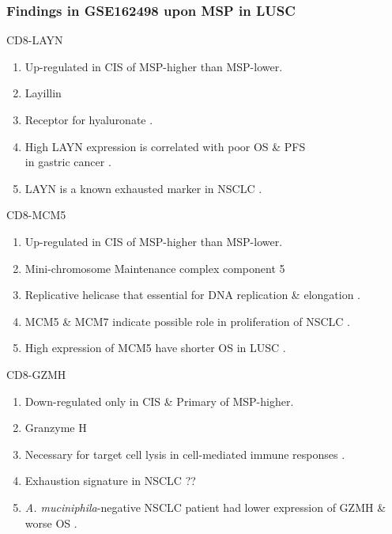 \documentclass{beamer}
\begin{document}
    \begin{frame}[allowframebreaks]
        \frametitle{Findings in GSE162498 upon MSP in LUSC}

        \begin{block}{CD8-LAYN}
            \begin{enumerate}
                \item Up-regulated in CIS of MSP-higher than MSP-lower.
                \item Layillin
                \item Receptor for hyaluronate \cite{LAYN-1}.
                \item High LAYN expression is correlated with poor OS \& PFS \\
                    in gastric cancer \cite{LAYN-2}.
                \item LAYN is a known exhausted marker in NSCLC \cite{LAYN-3}.
            \end{enumerate}
        \end{block}

        \begin{block}{CD8-MCM5}
            \begin{enumerate}
                \item Up-regulated in CIS of MSP-higher than MSP-lower.
                \item Mini-chromosome Maintenance complex component 5
                \item Replicative helicase that essential for DNA replication \& elongation \cite{MCM5-2}.
                \item MCM5 \& MCM7 indicate possible role in proliferation of NSCLC \cite{MCM5-3}.
                \item High expression of MCM5 have shorter OS in LUSC \cite{MCM5-4}.
            \end{enumerate}
        \end{block}

        \begin{block}{CD8-GZMH}
            \begin{enumerate}
                \item Down-regulated only in CIS \& Primary of MSP-higher.
                \item Granzyme H
                \item Necessary for target cell lysis in cell-mediated immune responses \cite{GZMH-1, GZMH-2}.
                \item Exhaustion signature in NSCLC \cite{GZMH-3} ??
                \item \textit{A. muciniphila}-negative NSCLC patient had lower expression of GZMH \& worse OS \cite{GZMH-4}.
            \end{enumerate}
        \end{block}


\end{frame}
\end{document}
